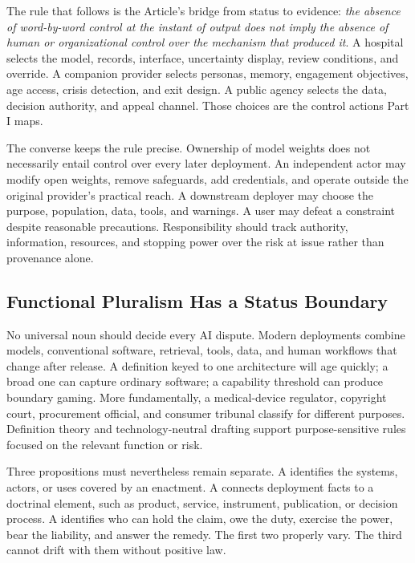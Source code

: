 The rule that follows is the Article's bridge from status to evidence: \emph{the absence of word-by-word control at the instant of output does not imply the absence of human or organizational control over the mechanism that produced it}. A hospital selects the model, records, interface, uncertainty display, review conditions, and override. A companion provider selects personas, memory, engagement objectives, age access, crisis detection, and exit design. A public agency selects the data, decision authority, and appeal channel. Those choices are the control actions Part I maps.

The converse keeps the rule precise. Ownership of model weights does not necessarily entail control over every later deployment. An independent actor may modify open weights, remove safeguards, add credentials, and operate outside the original provider's practical reach. A downstream deployer may choose the purpose, population, data, tools, and warnings. A user may defeat a constraint despite reasonable precautions. Responsibility should track authority, information, resources, and stopping power over the risk at issue rather than provenance alone.

\subsection{Functional Pluralism Has a Status Boundary}

No universal noun should decide every AI dispute. Modern deployments combine models, conventional software, retrieval, tools, data, and human workflows that change after release. A definition keyed to one architecture will age quickly; a broad one can capture ordinary software; a capability threshold can produce boundary gaming. More fundamentally, a medical-device regulator, copyright court, procurement official, and consumer tribunal classify for different purposes. Definition theory and technology-neutral drafting support purpose-sensitive rules focused on the relevant function or risk.

Three propositions must nevertheless remain separate. A  identifies the systems, actors, or uses covered by an enactment. A  connects deployment facts to a doctrinal element, such as product, service, instrument, publication, or decision process. A  identifies who can hold the claim, owe the duty, exercise the power, bear the liability, and answer the remedy. The first two properly vary. The third cannot drift with them without positive law.


